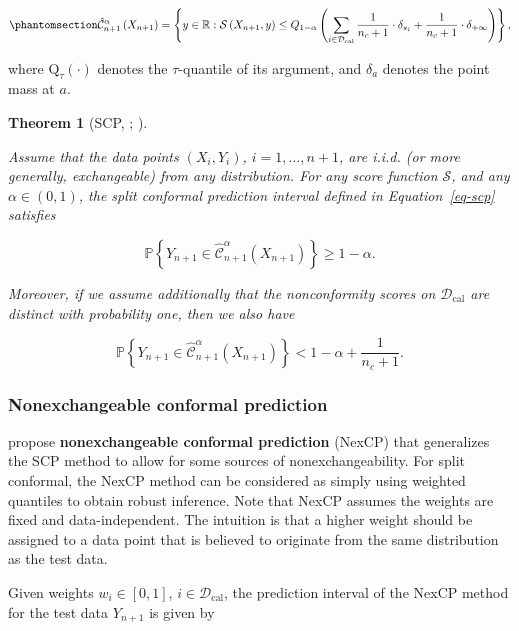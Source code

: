 \documentclass[
  11pt,
  a4paper,
]{article}
\theoremstyle{plain}
\theoremstyle{plain}
\newtheorem{theorem}{Theorem}[section]
\theoremstyle{remark}
\begin{document}
\begin{equation}\phantomsection\label{eq-scp}{
\hat{\mathcal{C}}_{n+1}^{\alpha}\left(X_{n+1}\right) = \left\{y\in\mathbb{R}: \mathcal{S}\left(X_{n+1}, y\right) \leq Q_{1-\alpha}\left(\sum_{i \in \mathcal{D}_{\text{cal}}}\frac{1}{n_c+1}\cdot\delta_{s_{i}}+\frac{1}{n_c+1}\cdot\delta_{+\infty}\right)\right\},
}\end{equation}

where \(\mathrm{Q}_\tau(\cdot)\) denotes the \(\tau\)-quantile of its
argument, and \(\delta_a\) denotes the point mass at \(a\).

\begin{theorem}[SCP, \textcite{vovk2005};
\textcite{lei2018}]\protect\hypertarget{thm-scp}{}\label{thm-scp}

Assume that the data points \((X_i, Y_i)\), \(i=1,\ldots,n+1\), are
i.i.d. (or more generally, exchangeable) from any distribution. For any
score function \(\mathcal{S}\), and any \(\alpha\in(0,1)\), the split
conformal prediction interval defined in Equation~\ref{eq-scp} satisfies

\[
\mathbb{P}\left\{Y_{n+1} \in \hat{\mathcal{C}}_{n+1}^{\alpha}\left(X_{n+1}\right)\right\} \geq 1-\alpha.
\]

Moreover, if we assume additionally that the nonconformity scores on
\(\mathcal{D}_{\text{cal}}\) are distinct with probability one, then we
also have

\[
\mathbb{P}\left\{Y_{n+1} \in \hat{\mathcal{C}}_{n+1}^{\alpha}\left(X_{n+1}\right)\right\} < 1-\alpha+\frac{1}{n_c+1}.
\]

\end{theorem}

\subsubsection{Nonexchangeable conformal
prediction}\label{nonexchangeable-conformal-prediction}

\textcite{barber2023} propose \textbf{nonexchangeable conformal
prediction} (NexCP) that generalizes the SCP method to allow for some
sources of nonexchangeability. For split conformal, the NexCP method can
be considered as simply using weighted quantiles to obtain robust
inference. Note that NexCP assumes the weights are fixed and
data-independent. The intuition is that a higher weight should be
assigned to a data point that is believed to originate from the same
distribution as the test data.

Given weights \(w_i \in [0,1]\), \(i \in \mathcal{D}_{\text{cal}}\), the
prediction interval of the NexCP method for the test data \(Y_{n+1}\) is
given by
\end{document}
